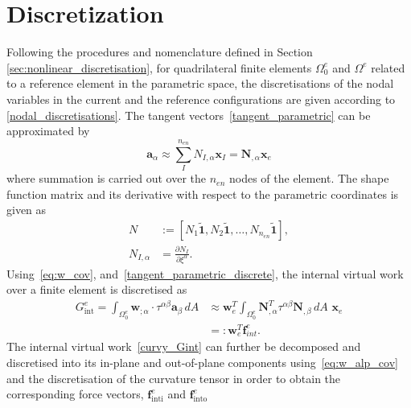 \section{Discretization}
Following the procedures and nomenclature defined in Section \ref{sec:nonlinear_discretisation}, for quadrilateral finite elements $\Omega^{e}_{0}$ and $\Omega^{e}$
 related to a reference element in the parametric space, the discretisations of the nodal variables in the current and the reference configurations are given according to \eqref{nodal_discretisations}.
The tangent vectors~\eqref{tangent_parametric} can be approximated by
\begin{equation} \label{tangent_parametric_discrete}
    \boldsymbol{a}_{\alpha} \approx \sum^{n_{en}}_{I} N_{I,\alpha} \boldsymbol{x}_{I} = \mathbf{N}_{,\alpha} \mathbf{x}_{e}
\end{equation}
where summation is carried out over the $n_{en}$ nodes of the element. The shape function matrix and its derivative with respect to the parametric coordinates
 is given as
\begin{align} \label{curvy_shape_function}
    N &:= \left[N_{1}\boldsymbol{\tilde{1}}, N_{2} \boldsymbol{\tilde{1}},\dots, N_{n_{en}} \boldsymbol{\tilde{1}}\right],\\
    N_{I,\alpha} & = \frac{\partial N_{I}}{\partial \xi^{\alpha}}.
\end{align}
%
Using~\eqref{eq:w_cov}, and~\eqref{tangent_parametric_discrete}, the internal virtual work
 over a finite element is discretised as
 \begin{equation} \label{curvy_Gint_discrete}
    \begin{split}
    G^{e}_{\text{int}} = \int_{\Omega_{0}^{e}} \boldsymbol{w}_{;\alpha} \cdot \tau^{\alpha \beta} \boldsymbol{a}_{\beta} \,dA 
    &\approx \mathbf{w}^{T}_{e} \int_{\Omega_{0}^{e}} \mathbf{N}^T_{,\alpha} \tau^{\alpha \beta} \mathbf{N}_{,\beta}\,dA \,\, \mathbf{x}_{e}\\ & =: \mathbf{w}^{T}_{e} \mathbf{f}^{e}_{int}.
    \end{split}
 \end{equation}
The internal virtual work~\eqref{curvy_Gint} can further be decomposed and discretised into its in-plane and out-of-plane components
 using~\eqref{eq:w_alp_cov} and the discretisation of the curvature tensor in order to obtain the corresponding force vectors, $\mathbf{f}^{e}_{\text{inti}}$
 and $\mathbf{f}^{e}_{\text{into}}$
